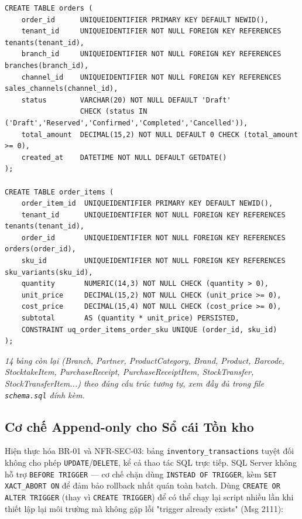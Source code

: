 \begin{lstlisting}
CREATE TABLE orders (
    order_id      UNIQUEIDENTIFIER PRIMARY KEY DEFAULT NEWID(),
    tenant_id     UNIQUEIDENTIFIER NOT NULL FOREIGN KEY REFERENCES tenants(tenant_id),
    branch_id     UNIQUEIDENTIFIER NOT NULL FOREIGN KEY REFERENCES branches(branch_id),
    channel_id    UNIQUEIDENTIFIER NOT NULL FOREIGN KEY REFERENCES sales_channels(channel_id),
    status        VARCHAR(20) NOT NULL DEFAULT 'Draft'
                  CHECK (status IN ('Draft','Reserved','Confirmed','Completed','Cancelled')),
    total_amount  DECIMAL(15,2) NOT NULL DEFAULT 0 CHECK (total_amount >= 0),
    created_at    DATETIME NOT NULL DEFAULT GETDATE()
);

CREATE TABLE order_items (
    order_item_id  UNIQUEIDENTIFIER PRIMARY KEY DEFAULT NEWID(),
    tenant_id      UNIQUEIDENTIFIER NOT NULL FOREIGN KEY REFERENCES tenants(tenant_id),
    order_id       UNIQUEIDENTIFIER NOT NULL FOREIGN KEY REFERENCES orders(order_id),
    sku_id         UNIQUEIDENTIFIER NOT NULL FOREIGN KEY REFERENCES sku_variants(sku_id),
    quantity       NUMERIC(14,3) NOT NULL CHECK (quantity > 0),
    unit_price     DECIMAL(15,2) NOT NULL CHECK (unit_price >= 0),
    cost_price     DECIMAL(15,4) NOT NULL CHECK (cost_price >= 0),
    subtotal       AS (quantity * unit_price) PERSISTED,
    CONSTRAINT uq_order_items_order_sku UNIQUE (order_id, sku_id)
);
\end{lstlisting}

\textit{14 bảng còn lại (Branch, Partner, ProductCategory, Brand, Product, Barcode, StocktakeItem, PurchaseReceipt, PurchaseReceiptItem, StockTransfer, StockTransferItem...) theo đúng cấu trúc tương tự, xem đầy đủ trong file \texttt{schema.sql} đính kèm.}

\subsection{Cơ chế Append-only cho Sổ cái Tồn kho}
\label{sec:append-only}
Hiện thực hóa BR-01 và NFR-SEC-03: bảng \texttt{inventory\_transactions} tuyệt đối không cho phép \texttt{UPDATE}/\texttt{DELETE}, kể cả thao tác SQL trực tiếp. SQL Server không hỗ trợ \texttt{BEFORE TRIGGER} — cơ chế chặn dùng \texttt{INSTEAD OF TRIGGER}, kèm \texttt{SET XACT\_ABORT ON} để đảm bảo rollback nhất quán toàn batch. Dùng \texttt{CREATE OR ALTER TRIGGER} (thay vì \texttt{CREATE TRIGGER}) để có thể chạy lại script nhiều lần khi thiết lập lại môi trường mà không gặp lỗi "trigger already exists" (Msg 2111):

